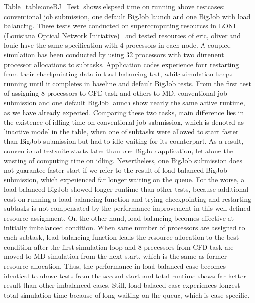 \documentclass[conference,final]{IEEEtran}
\begin{document}
Table~\ref{table:oneBJ_Test} shows elspsed time on running above testcases: conventional job submission, one default BigJob launch and one BigJob with load balancing. These tests were conducted on supercomputing resources in LONI (Louisiana Optical Network Initiative)~\cite{LONI_web} and tested resources of eric, oliver and louie have the same specification with 4 processors in each node. A coupled simulation has been conducted by using 32 processors with two dirrenent processor allocations to subtasks. Application codes experience four restarting from their checkpointing data in load balancing test, while simulation keeps running until it completes in baseline and default BigJob tests.
From the first test of assigning 8 processors to CFD task and others to MD, conventional job submission and one default BigJob launch show nearly the same active runtime, as we have already expected. Comparing these two tasks, main difference lies in the existence of idling time on conventional job submission, which is denoted as 'inactive mode' in the table, when one of subtasks were allowed to start faster than BigJob submission but had to idle waiting for its counterpart. As a result, conventional testsuite starts later than one BigJob application, let alone the wasting of computing time on idling. Nevertheless, one BigJob submission does not guarantee faster start if we refer to the result of load-balanced BigJob submission, which experienced far longer waiting on the queue. For the worse, a load-balanced BigJob showed longer runtime than other tests, because additional cost on running a load balancing function and trying checkpointing and restarting subtasks is not compensated by the performance improvement in this well-defined resource assignment.
On the other hand, load balancing becomes effective at initially imbalanced condition. When same number of processors are assigned to each subtask, load balancing function leads the resource allocation to the best condition after the first simulation loop and 8 processors from CFD task are moved to MD simulation from the next start, which is the same as former resource allocation. Thus, the performance in load balanced case becomes identical to above tests from the second start and total runtime shows far better result than other imbalanced cases. Still, load balaced case experiences longest total simulation time because of long waiting on the queue, which is case-specific.



\end{document}
